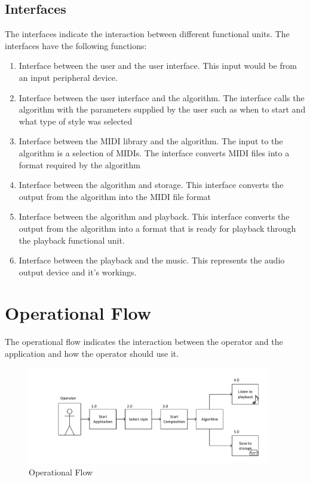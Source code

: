 \section{Interfaces}
The interfaces indicate the interaction between different functional units.
The interfaces have the following functions:
\begin{enumerate}
\item Interface between the user and the user interface. This input would be from an input peripheral device.
\item Interface between the user interface and the algorithm. The interface calls the algorithm with the parameters supplied by the user such as when to start and what type of style was selected
\item Interface between the \ac{MIDI} library and the algorithm. The input to the algorithm is a selection of \acp{MIDI}. The interface converts \ac{MIDI} files into a format required by the algorithm
\item Interface between the algorithm and storage. This interface converts the output from the algorithm into the \ac{MIDI} file format
\item Interface between the algorithm and playback. This interface converts the output from the algorithm into a format that is ready for playback through the playback functional unit.
\item Interface between the playback and the music. This represents the audio output device and it's workings.
\end{enumerate}


\chapter{Operational Flow}

The operational flow indicates the interaction between the operator and the application and how the operator should use it.

\begin{figure}[ht]
\centerline{\includegraphics[width=400px]{../images/operational_flow.pdf}}
\caption{Operational Flow}
\label{ims:oppflow}
\end{figure}

